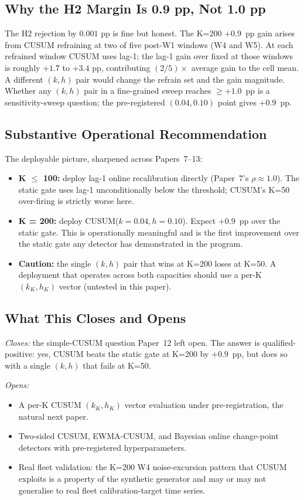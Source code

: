 \subsection{Why the H2 Margin Is 0.9 pp, Not 1.0 pp}

The H2 rejection by $0.001$ pp is fine but honest. The K=200
$+0.9$~pp gain arises from CUSUM refraining at two of five post-W1
windows (W4 and W5). At each refrained window CUSUM uses lag-1; the
lag-1 gain over fixed at those windows is roughly $+1.7$ to $+3.4$
pp, contributing $(2/5) \times $ average gain to the cell mean.
A different $(k, h)$ pair would change the refrain set and the
gain magnitude. Whether any $(k, h)$ pair in a fine-grained sweep
reaches $\geq +1.0$~pp is a sensitivity-sweep question; the
pre-registered $(0.04, 0.10)$ point gives $+0.9$~pp.

\subsection{Substantive Operational Recommendation}

The deployable picture, sharpened across Papers~7--13:

\begin{itemize}
\item \textbf{K $\leq$ 100:} deploy lag-1 online recalibration
directly (Paper~7's $\rho \approx 1.0$). The static gate uses lag-1
unconditionally below the threshold; CUSUM's K=50 over-firing is
strictly worse here.

\item \textbf{K = 200:} deploy CUSUM($k = 0.04, h = 0.10$). Expect
$+0.9$~pp over the static gate. This is operationally meaningful
and is the first improvement over the static gate any detector has
demonstrated in the program.

\item \textbf{Caution:} the single $(k, h)$ pair that wins at
K=200 loses at K=50. A deployment that operates across both
capacities should use a per-K $(k_K, h_K)$ vector (untested in this
paper).
\end{itemize}

\subsection{What This Closes and Opens}

\textit{Closes:} the simple-CUSUM question Paper~12 left open. The
answer is qualified-positive: yes, CUSUM beats the static gate at
K=200 by $+0.9$~pp, but does so with a single $(k, h)$ that fails
at K=50.

\textit{Opens:}
\begin{itemize}
\item A per-K CUSUM $(k_K, h_K)$ vector evaluation under
pre-registration, the natural next paper.
\item Two-sided CUSUM, EWMA-CUSUM, and Bayesian online change-point
detectors with pre-registered hyperparameters.
\item Real fleet validation: the K=200 W4 noise-excursion pattern
that CUSUM exploits is a property of the synthetic generator and
may or may not generalise to real fleet calibration-target time
series.
\end{itemize}
